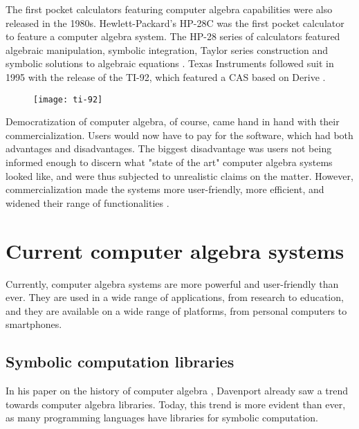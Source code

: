The first pocket calculators featuring computer algebra capabilities were also released in the 1980s. Hewlett-Packard's HP-28C was the first \parencite{nelson-hp-calculator-first} pocket calculator to feature a computer algebra system. The HP-28 series of calculators featured algebraic manipulation, symbolic integration, Taylor series construction and symbolic solutions to algebraic equations \parencite{hp-28s-manual}. Texas Instruments followed suit in 1995 with the release of the TI-92, which featured a CAS based on Derive \parencite{ti-92-guidebook}.

\begin{figure}[htb]
      {\texttt{[image: ti-92]}}
\end{figure}  

Democratization of computer algebra, of course, came hand in hand with their commercialization. Users would now have to pay for the software, which had both advantages and disadvantages. The biggest disadvantage was users not being informed enough to discern what "state of the art" computer algebra systems looked like, and were thus subjected to unrealistic claims on the matter. However, commercialization made the systems more user-friendly, more efficient, and widened their range of functionalities \parencite{geddes1992algorithms}.

\section{Current computer algebra systems}\label{sec:current-computer-algebra-systems}

Currently, computer algebra systems are more powerful and user-friendly than ever. They are used in a wide range of applications, from research to education, and they are available on a wide range of platforms, from personal computers to smartphones.

\subsection{Symbolic computation libraries}\label{subsec:symbolic-computation-libraries}

In his paper on the history of computer algebra \parencite{davenport1994computer}, Davenport already saw a trend towards computer algebra libraries. Today, this trend is more evident than ever, as many programming languages have libraries for symbolic computation.

